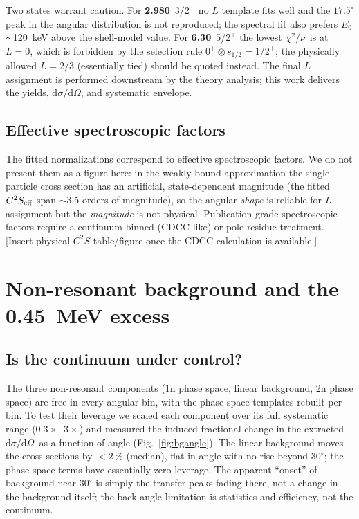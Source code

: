\documentclass[11pt,a4paper]{article}
\newcommand{\dsdo}{$\mathrm{d}\sigma/\mathrm{d}\Omega$}
\newcommand{\chinu}{$\chi^2/\nu$}
\newcommand{\note}[1]{\textcolor{red!70!black}{[#1]}}
\begin{document}
Two states warrant caution. For \textbf{2.980}~$3/2^+$ no $L$ template fits well
and the $17.5^\circ$ peak in the angular distribution is not reproduced; the
spectral fit also prefers $E_0$ $\sim$120~keV above the shell-model value. For
\textbf{6.30}~$5/2^+$ the lowest \chinu\ is at $L{=}0$, which is forbidden by the
selection rule $0^+\!\otimes s_{1/2}=1/2^+$; the physically allowed $L{=}2/3$
(essentially tied) should be quoted instead. The final $L$ assignment is
performed downstream by the theory analysis; this work delivers the yields,
\dsdo, and systematic envelope.

\subsection{Effective spectroscopic factors}
The fitted normalizations correspond to effective spectroscopic factors. We do
not present them as a figure here: in the weakly-bound approximation the
single-particle cross section has an artificial, state-dependent magnitude (the
fitted $C^2S_{\rm eff}$ span $\sim$3.5 orders of magnitude), so the angular
\emph{shape} is reliable for $L$ assignment but the \emph{magnitude} is not
physical. Publication-grade spectroscopic factors require a continuum-binned
(CDCC-like) or pole-residue treatment. \note{Insert physical $C^2S$ table/figure
once the CDCC calculation is available.}

\section{Non-resonant background and the 0.45~MeV excess}
\label{sec:bg}

\subsection{Is the continuum under control?}
The three non-resonant components (1n phase space, linear background, 2n phase
space) are free in every angular bin, with the phase-space templates rebuilt per
bin. To test their leverage we scaled each component over its full systematic
range ($0.3\times$--$3\times$) and measured the induced fractional change in the
extracted \dsdo\ as a function of angle (Fig.~\ref{fig:bgangle}). The linear
background moves the cross sections by $<2$\,\% (median), flat in angle with no
rise beyond $30^\circ$; the phase-space terms have essentially zero leverage.
The apparent ``onset'' of background near $30^\circ$ is simply the transfer
peaks fading there, not a change in the background itself; the back-angle
limitation is statistics and efficiency, not the continuum.
\end{document}

